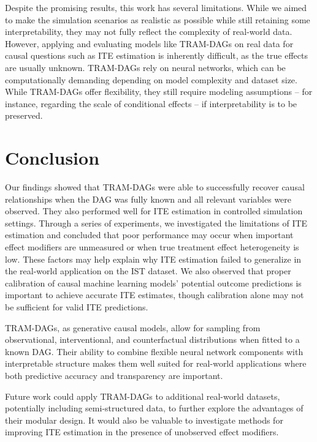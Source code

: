 Despite the promising results, this work has several limitations. While we aimed to make the simulation scenarios as realistic as possible while still retaining some interpretability, they may not fully reflect the complexity of real-world data. However, applying and evaluating models like TRAM-DAGs on real data for causal questions such as ITE estimation is inherently difficult, as the true effects are usually unknown. TRAM-DAGs rely on neural networks, which can be computationally demanding depending on model complexity and dataset size. While TRAM-DAGs offer flexibility, they still require modeling assumptions -- for instance, regarding the scale of conditional effects -- if interpretability is to be preserved.



\section{Conclusion}


Our findings showed that TRAM-DAGs were able to successfully recover causal relationships when the DAG was fully known and all relevant variables were observed. They also performed well for ITE estimation in controlled simulation settings. Through a series of experiments, we investigated the limitations of ITE estimation and concluded that poor performance may occur when important effect modifiers are unmeasured or when true treatment effect heterogeneity is low. These factors may help explain why ITE estimation failed to generalize in the real-world application on the IST dataset. We also observed that proper calibration of causal machine learning models' potential outcome predictions is important to achieve accurate ITE estimates, though calibration alone may not be sufficient for valid ITE predictions.

TRAM-DAGs, as generative causal models, allow for sampling from observational, interventional, and counterfactual distributions when fitted to a known DAG. Their ability to combine flexible neural network components with interpretable structure makes them well suited for real-world applications where both predictive accuracy and transparency are important.

Future work could apply TRAM-DAGs to additional real-world datasets, potentially including semi-structured data, to further explore the advantages of their modular design. It would also be valuable to investigate methods for improving ITE estimation in the presence of unobserved effect modifiers.

